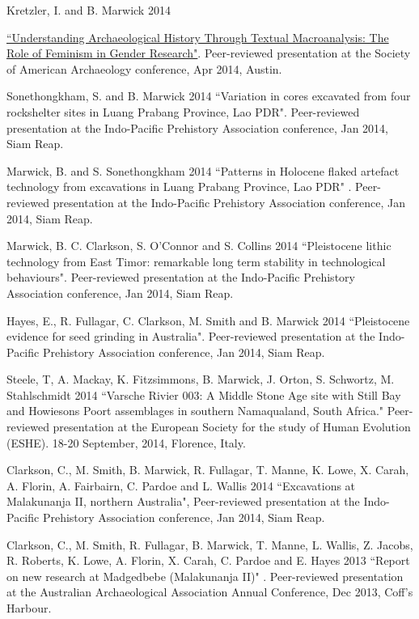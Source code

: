 {{\ind Kretzler, I. and B. Marwick 2014 {\href{https://github.com/benmarwick/kretzler-and-marwick-saa2014}{``Understanding Archaeological History Through Textual Macroanalysis: The Role of Feminism in Gender Research"}. Peer-reviewed presentation at the Society of American Archaeology conference, Apr 2014, Austin.

\ind Sonethongkham, S. and B. Marwick 2014 ``Variation in cores excavated from four rockshelter sites in Luang Prabang Province, Lao PDR". Peer-reviewed presentation at the Indo-Pacific Prehistory Association conference, Jan 2014, Siam Reap.

\ind Marwick, B.  and S. Sonethongkham 2014 ``Patterns in Holocene flaked artefact technology from excavations in Luang Prabang Province, Lao PDR" . Peer-reviewed presentation at the Indo-Pacific Prehistory Association conference, Jan 2014, Siam Reap.

\ind Marwick, B. C. Clarkson, S. O’Connor and S. Collins 2014 ``Pleistocene lithic technology from East Timor: remarkable long term stability in technological behaviours". Peer-reviewed presentation at the Indo-Pacific Prehistory Association conference, Jan 2014, Siam Reap.

\ind Hayes, E., R. Fullagar, C. Clarkson, M. Smith and B. Marwick 2014 ``Pleistocene evidence for seed grinding in Australia". Peer-reviewed presentation at the Indo-Pacific Prehistory Association conference, Jan 2014, Siam Reap.

\ind Steele, T, A. Mackay, K. Fitzsimmons, B. Marwick, J. Orton, S. Schwortz, M. Stahlschmidt 2014 ``Varsche Rivier 003: A Middle Stone Age site with Still Bay and Howiesons Poort assemblages in southern Namaqualand, South Africa." Peer-reviewed presentation at the European Society for the study of Human Evolution (ESHE). 18-20 September, 2014, Florence, Italy.

\ind Clarkson, C., M. Smith, B. Marwick, R. Fullagar, T. Manne, K. Lowe, X. Carah,  A. Florin, A.  Fairbairn, C. Pardoe and L. Wallis 2014 ``Excavations at Malakunanja II, northern Australia",  Peer-reviewed presentation at the Indo-Pacific Prehistory Association conference, Jan 2014, Siam Reap.

\ind Clarkson, C., M. Smith, R. Fullagar, B. Marwick, T. Manne, L. Wallis, Z. Jacobs, R. Roberts, K. Lowe, A. Florin, X. Carah, C. Pardoe and E. Hayes 2013 ``Report on new research at Madgedbebe (Malakunanja II)" . Peer-reviewed presentation at the Australian Archaeological Association Annual Conference, Dec 2013, Coff’s Harbour.

}}}
